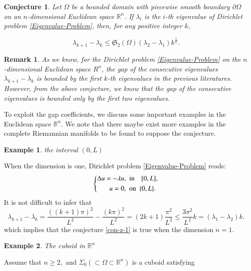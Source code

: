 \documentclass[12pt]{article}
\newtheorem{exa}{Example}[section]
\newtheorem{con}[thm]{Conjecture}
\newtheorem{rem}[thm]{Remark}
\numberwithin{equation}{section}
\begin{document}
\begin{con}\label{gap-conj-z}
Let $\Omega$ be a bounded domain with piecewise smooth boundary $\partial\Omega$ on an $n$-dimensional Euclidean space
$\mathbb{R}^{n}$.  If $\lambda_{i}$ is the $i$-th eigenvalue of Dirichlet problem \eqref{Eigenvalue-Problem}, then, for any positive integer $k$,

\begin{equation}\label{con-z-1'} \lambda_{k+1}-\lambda_{k}\leq \mathfrak{S}_{2}(\Omega)(\lambda_{2}-\lambda_{1})k^{\frac{1}{n}}.
\end{equation}
\end{con}


\begin{rem} As we know, for the Dirichlet problem \eqref{Eigenvalue-Problem} on the $n$-dimensional Euclidean space $R^{n}$, the gap of the consecutive eigenvalues $\lambda_{k+1}-\lambda_{k}$ is
bounded by the first $k$-th eigenvalues in the previous literatures. However, from the above conjecture, we know that the gap of the consecutive eigenvalues
is bounded only by the first two eigenvalues.
\end{rem}


To exploit the gap coefficients, we discuss some important examples in the Euclidean space $\mathbb{R}^{n}$. We note that
there maybe exist more examples in the complete Riemannian manifolds to be found to suppose the conjecture.

\begin{exa} \label{exa1}the interval $(0,L)$
\end{exa}

When the dimension is one, Dirichlet problem \eqref{Eigenvalue-Problem} reads:
\begin{equation}
\left\{ \begin{aligned} \label{Eigen-Prob-1-d}\Delta u=-\lambda u,\ \ &{\rm
in}\ \ \ \ [0,L],
         \\
u=0,\ \ &{\rm on}\ \ \{0,L\}.
                          \end{aligned} \right.
                          \end{equation}
It is not difficult to infer that $$\lambda_{k+1}-\lambda_{k}=\frac{((k+1)\pi)^{2}}{L^{2}}-\frac{(k\pi)^{2}}{L^{2}}=(2k+1)\frac{\pi^{2}}{L^{2}}\leq\frac{3\pi^{2}}{L^{2}}k=(\lambda_{1}-\lambda_{2})k.$$
which implies that the  conjecture \ref{con-z-1} is true when the dimension $n=1$.


\begin{exa} The cuboid in $\mathbb{R}^{n}$
\end{exa}
Assume that $n\geq2,$ and $\Sigma_{0}(\subset\Omega\subset\mathbb{R}^{n})$ is a cuboid satisfying
\end{document}
